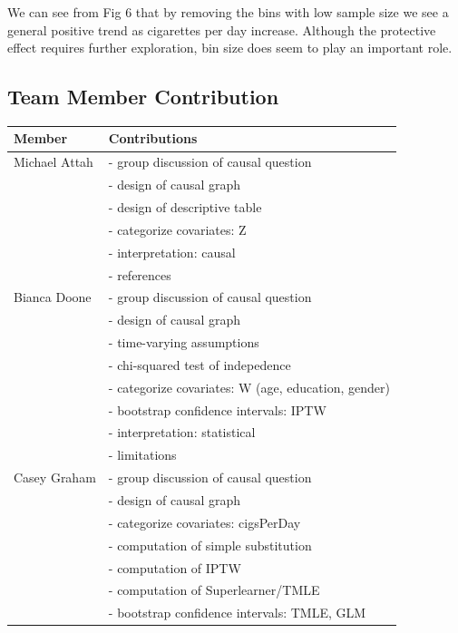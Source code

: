 \documentclass[]{article}
\begin{document}
We can see from Fig 6 that by removing the bins with low sample size we
see a general positive trend as cigarettes per day increase. Although
the protective effect requires further exploration, bin size does seem
to play an important role.

\newpage

\hypertarget{team-member-contribution}{%
\subsection{Team Member Contribution}\label{team-member-contribution}}

\begin{table}[h!]
  \begin{tabular}{|l|l|}
  \hline
    Member & Contributions \\ \hline
    Michael Attah & - group discussion of causal question \\
      & - design of causal graph \\
      & - design of descriptive table \\
      & - categorize covariates: Z\\
      & - interpretation: causal\\ 
      & - references \\ \hline
    Bianca Doone & - group discussion of causal question \\
      & - design of causal graph \\
      & - time-varying assumptions \\
      & - chi-squared test of indepedence\\
      & - categorize covariates: W (age, education, gender) \\
      & - bootstrap confidence intervals: IPTW \\
      & - interpretation: statistical \\
      & - limitations \\ \hline
    Casey Graham & - group discussion of causal question \\
      & - design of causal graph \\
      & - categorize covariates: cigsPerDay \\
      & - computation of simple substitution \\
      & - computation of IPTW \\
      & - computation of Superlearner/TMLE \\ 
      & - bootstrap confidence intervals: TMLE, GLM \\ \hline

\end{tabular}
\end{table}
\end{document}
